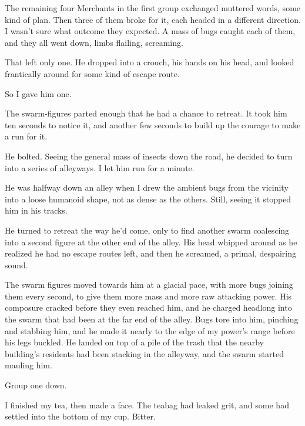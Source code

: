 The remaining four Merchants in the first group exchanged muttered words, some kind of plan.  Then three of them broke for it, each headed in a different direction.  I wasn't sure what outcome they expected.  A mass of bugs caught each of them, and they all went down, limbs flailing, screaming.



That left only one.  He dropped into a crouch, his hands on his head, and looked frantically around for some kind of escape route.



So I gave him one.



The swarm-figures parted enough that he had a chance to retreat.  It took him ten seconds to notice it, and another few seconds to build up the courage to make a run for it.



He bolted.  Seeing the general mass of insects down the road, he decided to turn into a series of alleyways.  I let him run for a minute.



He was halfway down an alley when I drew the ambient bugs from the vicinity into a loose humanoid shape, not as dense as the others.  Still, seeing it stopped him in his tracks.



He turned to retreat the way he'd come, only to find another swarm coalescing into a second figure at the other end of the alley.  His head whipped around as he realized he had no escape routes left, and then he screamed, a primal, despairing sound.



The swarm figures moved towards him at a glacial pace, with more bugs joining them every second, to give them more mass and more raw attacking power.  His composure cracked before they even reached him, and he charged headlong into the swarm that had been at the far end of the alley.  Bugs tore into him, pinching and stabbing him, and he made it nearly to the edge of my power's range before his legs buckled.  He landed on top of a pile of the trash that the nearby building's residents had been stacking in the alleyway, and the swarm started mauling him.



Group one down.



I finished my tea, then made a face.  The teabag had leaked grit, and some had settled into the bottom of my cup.  Bitter.



